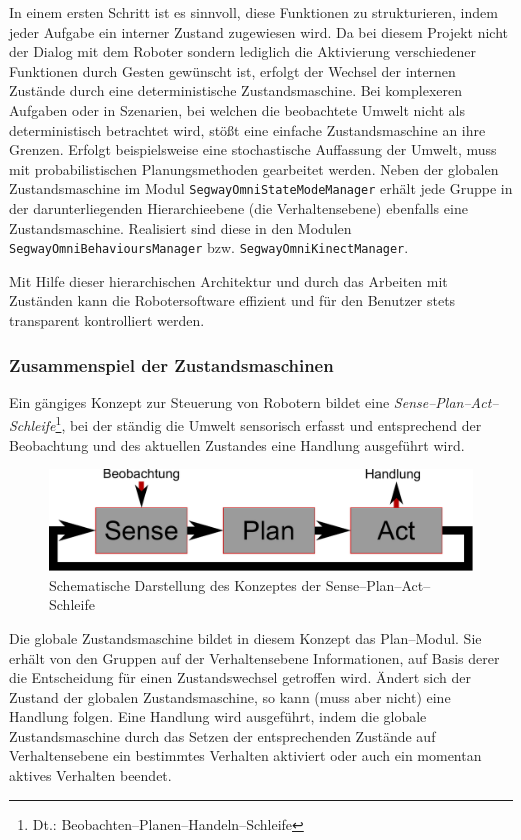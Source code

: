 In einem ersten Schritt ist es sinnvoll, diese Funktionen zu strukturieren, indem jeder Aufgabe ein 
interner Zustand zugewiesen wird. Da bei diesem Projekt nicht der Dialog mit dem Roboter sondern lediglich 
die Aktivierung verschiedener Funktionen durch Gesten gewünscht ist, erfolgt der Wechsel der internen 
Zustände durch eine deterministische Zustandsmaschine. Bei komplexeren 
Aufgaben oder in Szenarien, bei welchen die beobachtete Umwelt nicht als deterministisch betrachtet wird, stößt
eine einfache Zustandsmaschine an ihre Grenzen.
Erfolgt beispielsweise eine stochastische Auffassung der Umwelt, muss mit probabilistischen Planungsmethoden gearbeitet werden.
Neben der globalen Zustandsmaschine im Modul
\lstinline{SegwayOmniStateModeManager} erhält jede Gruppe in der darunterliegenden Hierarchieebene (die Verhaltensebene) ebenfalls eine Zustandsmaschine.
Realisiert sind diese in den Modulen \lstinline{SegwayOmniBehavioursManager} bzw. \lstinline{SegwayOmniKinectManager}.

Mit Hilfe dieser hierarchischen Architektur und durch das Arbeiten mit Zuständen kann die Robotersoftware effizient und für den Benutzer stets transparent kontrolliert werden.


\subsubsection{Zusammenspiel der Zustandsmaschinen}
\label{integration_umsetzung_zusammenspiel_sec}

Ein gängiges Konzept zur Steuerung von Robotern bildet 
eine \textit{Sense--Plan--Act--Schleife}\footnote{Dt.: Beobachten--Planen--Handeln--Schleife}, bei der 
ständig die Umwelt sensorisch erfasst und entsprechend der Beobachtung und des aktuellen Zustandes 
eine Handlung ausgeführt wird.
\begin{figure}[h]
	\label{fig:integration_sense_plan_act}
	\centering
	\includegraphics[scale=0.5]{graphics/SCHEMA-SensePlanAct.pdf}
	\caption{Schematische Darstellung des Konzeptes der Sense--Plan--Act--Schleife}
\end{figure}
Die globale Zustandsmaschine bildet in diesem Konzept das Plan--Modul. Sie erhält von den Gruppen auf 
der Verhaltensebene Informationen, auf Basis derer die Entscheidung für einen Zustandswechsel getroffen wird.
Ändert sich der Zustand der globalen Zustandsmaschine, so kann (muss aber nicht) eine Handlung folgen.
Eine Handlung wird ausgeführt, indem die globale Zustandsmaschine durch das 
Setzen der entsprechenden Zustände auf Verhaltensebene ein bestimmtes Verhalten aktiviert oder auch ein momentan aktives Verhalten beendet.

